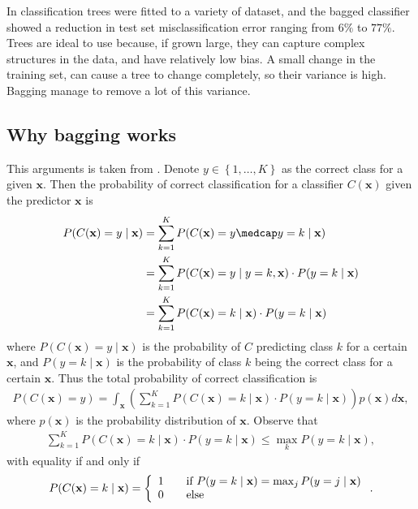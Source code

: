 In \cite{Breiman1996} classification trees were fitted to a variety of dataset, and the bagged classifier showed a reduction in test set misclassification error ranging from $6\%$ to $77\%$.  Trees are ideal to use because, if grown large, they can capture complex structures in the data, and have relatively low bias. A small change in the training set, can cause a tree to change completely, so their variance is high. Bagging manage to remove a lot of this variance. 

\subsection{Why bagging works}
\label{sub:Why bagging works}
This arguments is taken from \cite{Breiman1996}. Denote $y \in \left\{ 1, \ldots, K \right\}$ as the correct class for a given $\mathbf{x}$. Then the probability of correct classification for a classifier $C(\mathbf{x})$ given the predictor $\mathbf{x}$ is 
\begin{align}
  P(C(\mathbf{x}) = y \mid \mathbf{x})  &= \sum^{K}_{k=1} P(C(\mathbf{x})=y \medcap y = k \mid \mathbf{x}) \notag \\
  &= \sum^{K}_{k=1} P(C(\mathbf{x}) = y \mid y = k, \mathbf{x}) \cdot P(y=k \mid \mathbf{x}) \notag \\
  &= \sum^{K}_{k=1} P(C(\mathbf{x}) = k \mid \mathbf{x}) \cdot P(y=k \mid \mathbf{x}) 
\end{align}
where $P(C(\mathbf{x})=y \mid \mathbf{x})$ is the probability of $C$ predicting class $k$ for a certain $\mathbf{x}$, and $P(y=k \mid \mathbf{x})$ is the probability of class $k$ being the correct class for a certain $\mathbf{x}$. Thus the total probability of correct classification is 
\begin{align}
  P(C(\mathbf{x}) = y) = \int_{\mathbf{x}} \left(\sum^{K}_{k=1} P(C(\mathbf{x}) = k \mid \mathbf{x}) \cdot P(y=k \mid \mathbf{x})   \right) p(\mathbf{x}) d\mathbf{x},
\end{align}
where $p(\mathbf{x})$ is the probability distribution of $\mathbf{x}$. Observe that 
\begin{align}
  \sum^{K}_{k=1} P(C(\mathbf{x}) = k \mid \mathbf{x}) \cdot P(y=k \mid \mathbf{x}) \leq \max_k P(y = k \mid \mathbf{x}),
\end{align}
with equality if and only if 
\begin{align}
  P(C(\mathbf{x}) = k \mid \mathbf{x}) = \left\{ 
  \begin{array}{l l}
    1 & \quad \text{if } P(y = k \mid \mathbf{x}) = \max_j P(y = j \mid \mathbf{x})\\
    0 & \quad \text{else}
  \end{array} \right. .
\end{align}
